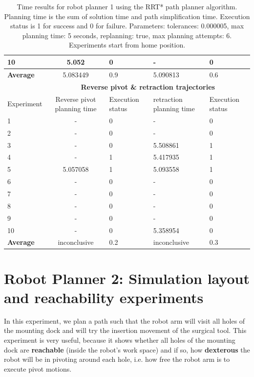 \begin{table}[H]
\begin{tabular}{|p{2cm}|c|p{2cm}|p{2cm}|p{2cm}|}
10  & 5.052 & 0  & - &  0 \\
\hline
\textbf{Average} & 	5.083449	& 0.9	& 5.090813	& 0.6 \\
\hline
                          & \multicolumn{4}{c}{\textbf{Reverse pivot \& retraction trajectories}}                     \vline \\
\hline
Experiment                & Reverse pivot planning time & Execution status & retraction planning time & Execution status  \\
\hline
1 & -	& 0	& -	& 0 \\
2 & -	& 0	& -	& 0 \\
3 & -	& 0	& 5.508861	& 1 \\
4 & -	& 1	& 5.417935	& 1 \\
5 & 5.057058	& 1	& 5.093558	& 1 \\
6 & -	& 0	& -	& 0 \\
7 & -	& 0	& -	& 0 \\
8 & -	& 0	& -	& 0 \\
9 & -	& 0	& -	& 0 \\
10  & -	& 0	& 5.358954	& 0 \\
\hline
\textbf{Average} & inconclusive	& 0.2	& inconclusive	& 0.3 \\
\hline
\end{tabular}
\caption{Time results for robot planner 1 using the RRT* path planner algorithm. Planning time is the sum of solution time and path simplification time. Execution status is 
1 for success and 0 for failure. Parameters: tolerances: 0.000005, max planning time: 5 seconds, replanning: true, max planning attempts: 6. Experiments start from home position.}
\label{robot-planner1-rrtstar-data}
\end{table}


\section{Robot Planner 2: Simulation layout and reachability experiments}

In this experiment, we plan a path such that the robot arm will visit all holes of the mounting dock and will try the insertion movement of the surgical tool.
This experiment is very useful, because it shows whether all holes of the mounting dock are \textbf{reachable} (inside the robot's work space) and if so, how 
\textbf{dexterous} the robot will be in pivoting around each hole, i.e. how free the robot arm is to execute pivot motions.

